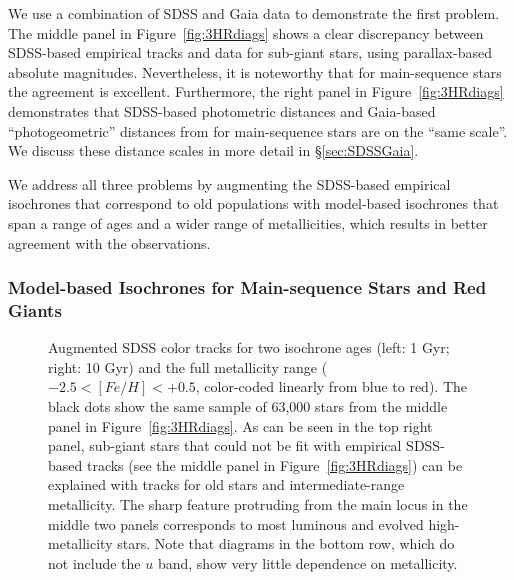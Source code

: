 We use a combination of SDSS and Gaia data to demonstrate the first problem. The middle panel in Figure~\ref{fig:3HRdiags} 
shows a clear discrepancy between SDSS-based empirical tracks and data for sub-giant stars, using parallax-based absolute
magnitudes. Nevertheless, it is noteworthy that
for main-sequence stars the agreement is excellent. Furthermore, the right panel in Figure~\ref{fig:3HRdiags} demonstrates
that SDSS-based photometric distances and Gaia-based ``photogeometric'' distances from \cite{bailer-jones_estimating_2021}
for main-sequence stars are on the ``same scale''.  We discuss these
distance scales in more detail in \S\ref{sec:SDSSGaia}. 
 
We address all three problems by augmenting the SDSS-based empirical isochrones that correspond to old
populations with model-based isochrones that span a range of ages and a wider range of metallicities, which
results in better agreement with the observations. 
 

\subsubsection{Model-based Isochrones for Main-sequence Stars and Red Giants} 
 

\begin{figure}[ht!]
\caption{Augmented SDSS color tracks for two isochrone ages (left: 1 Gyr; right: 10 Gyr) and the full metallicity range
  ($-2.5 < [Fe/H] < +0.5$, color-coded linearly from blue to red). The black dots show the same sample of 63,000 stars from the middle panel in
  Figure~\ref{fig:3HRdiags}. As can be seen in the top right panel, sub-giant stars that could not be fit with empirical
  SDSS-based tracks (see the middle panel in Figure~\ref{fig:3HRdiags}) can be explained with tracks for old stars and
  intermediate-range metallicity. The sharp feature protruding from the main locus in the middle two panels corresponds
  to most luminous and evolved high-metallicity stars. Note that diagrams in the bottom row, which do not include
  the $u$ band, show very little dependence on metallicity.}  
\label{fig:augmLocus}
\end{figure}


